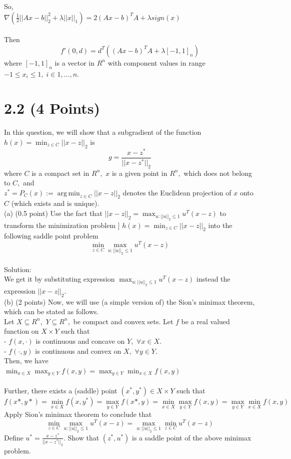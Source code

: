 \documentclass{article}
\begin{document}
So, \\
$
\nabla (\frac{1}{2} ||Ax - b||^2_2 + \lambda ||x||_1) = 
2(Ax - b)^T A + \lambda sign(x)
$
\\ \\
Then \\
$$
f'(0, d) = d^T ((Ax - b)^T A + \lambda [-1, 1]_n) 
$$
where $ [-1, 1]_n$ is a vector in $R^n$ with component values in range \\
$-1 \leq x_i \leq 1, \; i \in {1, \dots , n}.$

\section*{2.2 (4 Points)} 
In this question, we will show that a subgradient of the function \\ 
$h(x) = \min_{z \in C} ||x - z||_2$ is 
$$
g = \frac{x - z^*}{||x - z^*||_2}
$$
where $C$ is a compact set in $R^n,$ $x$ is a given point in $R^n,$ which does not belong to $C,$ and \\ 
$z^* = P_C(x) := \operatorname*{arg\,min}_{z \in C}||x - z||_2$ denotes the Euclidean projection of $x$ onto
$C$ (which exists and is unique). \\

(a) (0.5 point) Use the fact that 
$||x - z||_2 = \max_{u:||u||_2 \leq 1} u^T(x - z)$ to transform the minimization problem ]
$h(x) = \min_{z \in C} ||x - z||_2$ into the following saddle point problem
$$
\min_{z \in C} \max_{u:||u||_2 \leq 1} u^T(x - z)
$$
\\ Solution: \\

We get it by substituting expression $\max_{u:||u||_2 \leq 1} u^T(x - z)$ instead the expression $||x - z||_2.$\\

(b) (2 points) Now, we will use (a simple version of) the Sion's minimax theorem, which can be stated as follows. \\
Let $X \subseteq R^n, $ $Y \subseteq R^n, $ be compact and convex sets. Let $f$ be a real valued function on 
$X\times Y$ such that \\
- $f(x, \cdot) $ is continuous and concave on $Y, $ 
$\forall x \in X.$ \\
- $f(\cdot, y) $ is continuous and convex on $X, $ 
$\forall y \in Y.$ \\

Then, we have \\
$\min_{x \in X} \max_{y \in Y} f(x, y) = \max_{y \in Y} \min_{x \in X}  f(x, y)$ \\ \\
Further, there exists a (saddle) point 
$(x^*, y^*) \in X \times Y $ such that 
$$
f(x*, y*) = \min_{x \in X} f(x, y^*) = 
\max_{y \in Y} f(x*, y) = \min_{x \in X} \max_{y \in Y} f(x, y) = \max_{y \in Y} \min_{x \in X}  f(x, y)
$$
Apply Sion's minimax theorem to conclude that
$$
\min_{z \in C} \max_{u:||u||_2 \leq 1} u^T(x - z) = 
 \max_{u:||u||_2 \leq 1} \min_{z \in C} u^T(x - z)
$$
Define $u^* = \frac{x - z^*}{||x - z^*||_2}.$ Show that 
$(z^*, u^*)$ is a saddle point of the above minimax problem.
\\
\end{document}
